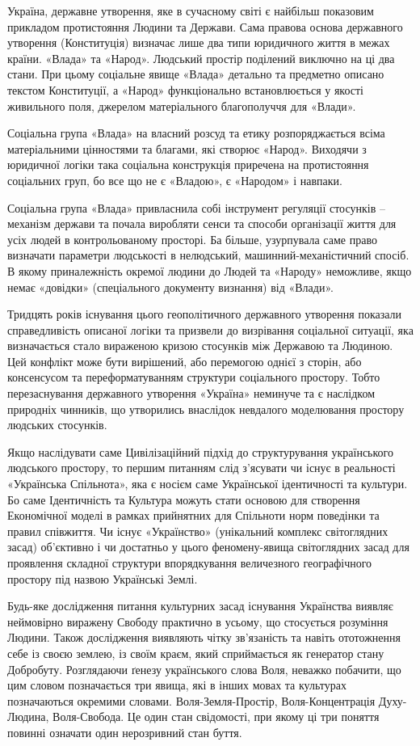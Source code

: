 Україна, державне утворення, яке в сучасному світі є найбільш показовим
прикладом протистояння Людини та Держави. Сама правова основа державного
утворення (Конституція) визначає лише два типи юридичного життя в межах країни.
«Влада» та «Народ». Людський простір поділений виключно на ці два стани. При
цьому соціальне явище «Влада» детально та предметно описано текстом
Конституції, а «Народ» функціонально встановлюється у якості живильного поля,
джерелом матеріального благополуччя для «Влади».

Соціальна група «Влада» на власний розсуд та етику розпоряджається всіма
матеріальними цінностями та благами, які створює «Народ». Виходячи з юридичної
логіки така соціальна конструкція приречена на протистояння соціальних груп, бо
все що не є «Владою», є «Народом» і навпаки.

Соціальна група «Влада» привласнила собі інструмент регуляції стосунків –
механізм держави та почала виробляти сенси та способи організації життя для
усіх людей в контрольованому просторі. Ба більше, узурпувала саме право
визначати параметри людськості в нелюдський, машинний-механістичний спосіб. В
якому приналежність окремої людини до Людей та «Народу» неможливе, якщо немає
«довідки» (спеціального документу визнання) від «Влади».

Тридцять років існування цього геополітичного державного утворення показали
справедливість описаної логіки та призвели до визрівання соціальної ситуації,
яка визначається стало вираженою кризою стосунків між Державою та Людиною. Цей
конфлікт може бути вирішений, або перемогою однієї з сторін, або консенсусом та
переформатуванням структури соціального простору. Тобто перезаснування
державного утворення «Україна» неминуче та є наслідком природніх чинників, що
утворились внаслідок невдалого моделювання простору людських стосунків.

Якщо наслідувати саме Цивілізаційний підхід до структурування українського
людського простору, то першим питанням слід з’ясувати чи існує в реальності
«Українська Спільнота», яка є носієм саме Української ідентичності та культури.
Бо саме Ідентичність та Культура можуть стати основою для створення Економічної
моделі в рамках прийнятних для Спільноти норм поведінки та правил співжиття. Чи
існує «Українство» (унікальний комплекс світоглядних засад) об’єктивно і чи
достатньо у цього феномену-явища світоглядних засад для проявлення складної
структури впорядкування величезного географічного простору під назвою
Українські Землі.

Будь-яке дослідження питання культурних засад існування Українства виявляє
неймовірно виражену Свободу практично в усьому, що стосується розуміння Людини.
Також дослідження виявляють чітку зв’язаність та навіть ототожнення себе із
своєю землею, із своїм краєм, який сприймається як генератор стану Добробуту.
Розглядаючи ґенезу українського слова Воля, неважко побачити, що цим словом
позначається три явища, які в інших мовах та культурах позначаються окремими
словами. Воля-Земля-Простір, Воля-Концентрація Духу-Людина, Воля-Свобода. Це
один стан свідомості, при якому ці три поняття повинні означати один
нерозривний стан буття.

